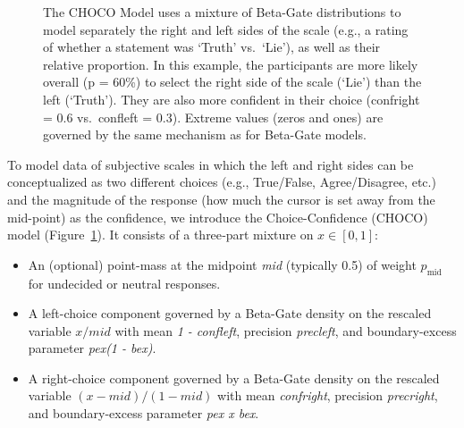 \documentclass[
  jou,
  floatsintext,
  longtable,
  nolmodern,
  notxfonts,
  notimes,
  colorlinks=true,linkcolor=blue,citecolor=blue,urlcolor=blue]{apa7}
\providecommand{\tightlist}{%
  \setlength{\itemsep}{0pt}\setlength{\parskip}{0pt}}
\begin{document}
\begin{figure}

\caption{\label{fig-two}The CHOCO Model uses a mixture of Beta-Gate
distributions to model separately the right and left sides of the scale
(e.g., a rating of whether a statement was `Truth' vs.~`Lie'), as well
as their relative proportion. In this example, the participants are more
likely overall (p = 60\%) to select the right side of the scale (`Lie')
than the left (`Truth'). They are also more confident in their choice
(confright = 0.6 vs.~confleft = 0.3). Extreme values (zeros and ones)
are governed by the same mechanism as for Beta-Gate models.}


\end{figure}%

To model data of subjective scales in which the left and right sides can
be conceptualized as two different choices (e.g., True/False,
Agree/Disagree, etc.) and the magnitude of the response (how much the
cursor is set away from the mid-point) as the confidence, we introduce
the Choice-Confidence (CHOCO) model (Figure~\ref{fig-two}). It consists
of a three‐part mixture on \(x \in [0, 1]\):

\begin{itemize}
\tightlist
\item
  An (optional) point-mass at the midpoint \emph{mid} (typically 0.5) of
  weight \(p_{\text{mid}}\) for undecided or neutral responses.\\
\item
  A left-choice component governed by a Beta-Gate density on the
  rescaled variable \(x/mid\) with mean \emph{1 - confleft}, precision
  \emph{precleft}, and boundary-excess parameter \emph{pex(1 - bex)}.\\
\item
  A right-choice component governed by a Beta-Gate density on the
  rescaled variable \((x - mid)/(1 - mid)\) with mean \emph{confright},
  precision \emph{precright}, and boundary-excess parameter \emph{pex x
  bex}.
\end{itemize}
\end{document}
